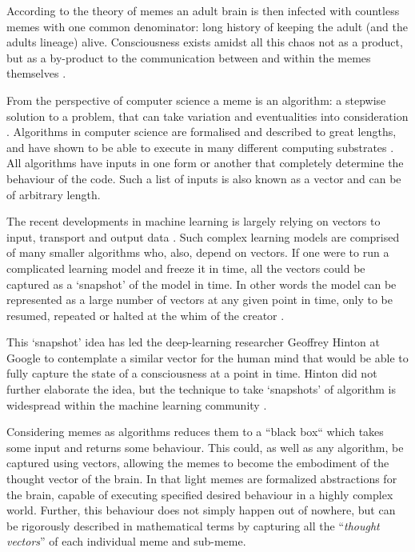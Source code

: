 \documentclass[a4paper,oneside]{memoir}
\begin{document}
According to the theory of memes an adult brain is then infected with countless memes with
one common denominator: long history of keeping the adult (and the adults lineage) alive.
Consciousness exists amidst all this chaos not as a product, but as a by-product to the
communication between and within the memes themselves \autocite{dennett2017}.

From the perspective of computer science a \gls{meme} is an algorithm: a stepwise solution
to a problem, that can take variation and eventualities into consideration 
\autocite{Nilsson2009, russel2007}. Algorithms in computer science are formalised and described
to great lengths, and have shown to be able to execute in many different computing substrates
\autocite{Nilsson2009}. All algorithms have inputs in one form or another that completely
determine
the behaviour of the code. Such a list of inputs is also known as a vector and can be 
of arbitrary length. 

The recent developments in machine learning is largely relying on vectors to input, transport
and output data \autocite{russel2007}. Such complex learning models are comprised of many smaller
algorithms who, also, depend on vectors. If one were to run a complicated learning model and 
freeze it in time, all the vectors could be captured as a `snapshot' of the model in time.
In other words the model can be represented as a large number of vectors at any given point
in time, only to be resumed, repeated or halted at the whim of the creator \autocite{Nilsson2009}.

This `snapshot' idea has led the deep-learning researcher Geoffrey Hinton at Google to
contemplate a
similar vector for the human mind that would be able to fully capture the state of a consciousness
at a point in time\autocite{goh2017}. Hinton did not further elaborate the idea,
but the technique to take `snapshots' of algorithm is widespread
within the machine learning community \autocite{russel2007}.

Considering memes as algorithms reduces them to a ``black box`` which takes some input
and returns some behaviour. This could, as well as any algorithm, be captured using vectors,
allowing the memes to become the embodiment of the thought vector of the brain. In that light
memes are formalized abstractions for the brain, capable
of executing specified desired behaviour in a highly complex world. Further, this
behaviour does not simply happen out of nowhere, but can be rigorously described in
mathematical terms by capturing all the ``\textit{thought vectors}'' of each individual
\gls{meme} and sub-meme.
\end{document}
